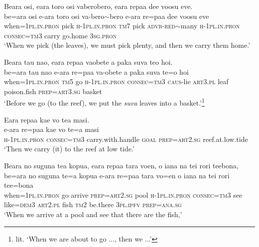 \ea\label{ex:text29-5}
Beara osi, eara toro osi vaberobero, eara repaa dee voosu eve.\\
\gll be=ara	osi	e-ara	toro	osi	va-bero{$\sim$}bero	e-ara	re=paa	dee	voosu	eve\\
     when=1\textsc{pl}.\textsc{in}.\textsc{pron}	pick	\textsc{h}-1\textsc{pl}.\textsc{in}.\textsc{pron}	\textsc{tm}7	pick	\textsc{advr}-\textsc{red}{$\sim$}many	\textsc{h}-1\textsc{pl}.\textsc{in}.\textsc{pron}	\textsc{consec}=\textsc{tm}3	carry	go.home	3\textsc{sg}.\textsc{pron}\\
\glt `When we pick (the leaves), we must pick plenty, and then we carry them home.'
\z

\ea\label{ex:text29-6}
Beara tau nao, eara repaa vaobete a paka suva teo hoi.\\
\gll be=ara	tau	nao	e-ara	re=paa	va-obete	a	paka	suva	te=o	hoi\\
     when=1\textsc{pl}.\textsc{in}.\textsc{pron}	\textsc{tm}5	go	\textsc{h}-1\textsc{pl}.\textsc{in}.\textsc{pron}	\textsc{consec}=\textsc{tm}3	\textsc{caus}-lie	\textsc{art}3.\textsc{pl}	leaf	poison.fish	\textsc{prep}=\textsc{art}3.\textsc{sg}	basket\\
\glt `Before we go (to the reef), we put the \textit{suva} leaves into a basket.'\footnote{lit. `When we are about to go ..., then we ...'}
\z

\ea\label{ex:text29-7}
Eara repaa kae vo tea masi.\\
\gll e-ara	re=paa	kae	vo	te=a	masi\\
     \textsc{h}-1\textsc{pl}.\textsc{in}.\textsc{pron}	\textsc{consec}=\textsc{tm}3	carry.with.handle	\textsc{goal}	\textsc{prep}=\textsc{art}2.\textsc{sg}	reef.at.low.tide\\
\glt `Then we carry (it) to the reef at low tide.'
\z

\ea\label{ex:text29-8}
Beara no suguna tea kopua, eara repaa tara voen, o iana na tei rori teebona,\\
\gll be=ara	no	suguna	te=a	kopua	e-ara	re=paa	tara	vo=en	o	iana	na	tei	rori	tee=bona\\
     when=1\textsc{pl}.\textsc{in}.\textsc{pron}	go	arrive	\textsc{prep}=\textsc{art}2.\textsc{sg}	pool	\textsc{h}-1\textsc{pl}.\textsc{in}.\textsc{pron}	\textsc{consec}=\textsc{tm}3	see	like=\textsc{dem}3	\textsc{art}2.\textsc{pl}	fish	\textsc{tm}2	be.there	3\textsc{pl}.\textsc{ipfv}	\textsc{prep}=\textsc{ana}.\textsc{sg}\\
\glt `When we arrive at a pool and see that there are the fish,'
\z

